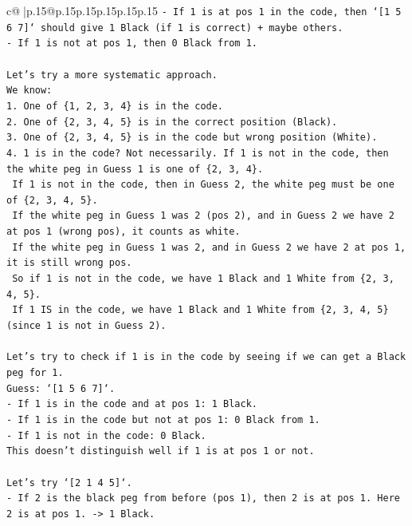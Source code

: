 \documentclass{article}
\begin{document}
{\begin{supertabular}{c@{$\;$}|p{.15\linewidth}@{}p{.15\linewidth}p{.15\linewidth}p{.15\linewidth}p{.15\linewidth}p{.15\linewidth}}
{{{\texttt{{-} If 1 is at pos 1 in the code, then `{[}1 5 6 7{]}` should give 1 Black (if 1 is correct) + maybe others.} \\
\texttt{{-} If 1 is not at pos 1, then 0 Black from 1.} \\
\\ 
\texttt{Let's try a more systematic approach.} \\
\texttt{We know:} \\
\texttt{1. One of \{1, 2, 3, 4\} is in the code.} \\
\texttt{2. One of \{2, 3, 4, 5\} is in the correct position (Black).} \\
\texttt{3. One of \{2, 3, 4, 5\} is in the code but wrong position (White).} \\
\texttt{4. 1 is in the code? Not necessarily. If 1 is not in the code, then the white peg in Guess 1 is one of \{2, 3, 4\}.} \\
\texttt{   If 1 is not in the code, then in Guess 2, the white peg must be one of \{2, 3, 4, 5\}.} \\
\texttt{   If the white peg in Guess 1 was 2 (pos 2), and in Guess 2 we have 2 at pos 1 (wrong pos), it counts as white.} \\
\texttt{   If the white peg in Guess 1 was 2, and in Guess 2 we have 2 at pos 1, it is still wrong pos.} \\
\texttt{   So if 1 is not in the code, we have 1 Black and 1 White from \{2, 3, 4, 5\}.} \\
\texttt{   If 1 IS in the code, we have 1 Black and 1 White from \{2, 3, 4, 5\} (since 1 is not in Guess 2).} \\
\\ 
\texttt{Let's try to check if 1 is in the code by seeing if we can get a Black peg for 1.} \\
\texttt{Guess: `{[}1 5 6 7{]}`.} \\
\texttt{{-} If 1 is in the code and at pos 1: 1 Black.} \\
\texttt{{-} If 1 is in the code but not at pos 1: 0 Black from 1.} \\
\texttt{{-} If 1 is not in the code: 0 Black.} \\
\texttt{This doesn't distinguish well if 1 is at pos 1 or not.} \\
\\ 
\texttt{Let's try `{[}2 1 4 5{]}`.} \\
\texttt{{-} If 2 is the black peg from before (pos 1), then 2 is at pos 1. Here 2 is at pos 1. {-}> 1 Black.} \\
}}}
\end{supertabular}}
\end{document}
